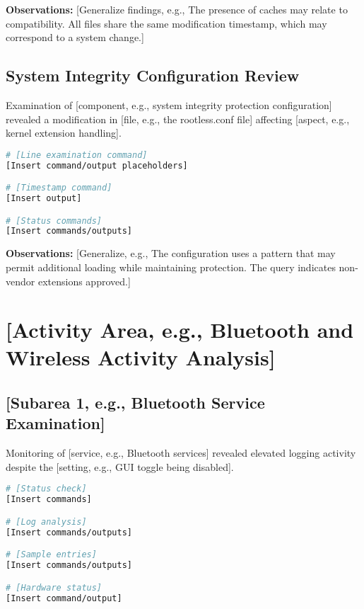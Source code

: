 \documentclass[11pt, a4paper]{article}
\begin{document}
\textbf{Observations:} [Generalize findings, e.g., The presence of caches may relate to compatibility. All files share the same modification timestamp, which may correspond to a system change.]

\subsection{System Integrity Configuration Review}
Examination of [component, e.g., system integrity protection configuration] revealed a modification in [file, e.g., the rootless.conf file] affecting [aspect, e.g., kernel extension handling].

\begin{lstlisting}[language=bash, caption={System Integrity Configuration - [File] Analysis}, label={lst:rootless}]
# [Line examination command]
[Insert command/output placeholders]

# [Timestamp command]
[Insert output]

# [Status commands]
[Insert commands/outputs]
\end{lstlisting}

\textbf{Observations:} [Generalize, e.g., The configuration uses a pattern that may permit additional loading while maintaining protection. The query indicates non-vendor extensions approved.]

\section{[Activity Area, e.g., Bluetooth and Wireless Activity Analysis]}

\subsection{[Subarea 1, e.g., Bluetooth Service Examination]}
Monitoring of [service, e.g., Bluetooth services] revealed elevated logging activity despite the [setting, e.g., GUI toggle being disabled].

\begin{lstlisting}[language=bash, caption={[Service] Activity Monitoring - [Date]}, label={lst:bluetooth}]
# [Status check]
[Insert commands]

# [Log analysis]
[Insert commands/outputs]

# [Sample entries]
[Insert commands/outputs]

# [Hardware status]
[Insert command/output]
\end{lstlisting}
\end{document}
